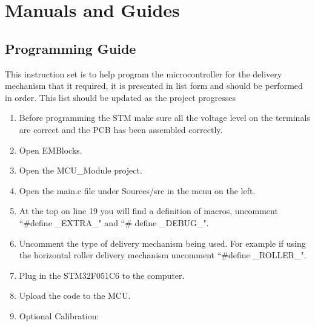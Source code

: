 \documentclass[a4paper,11pt]{article}
\numberwithin{figure}{section}
\numberwithin{table}{section}
\begin{document}
\begin{appendices}
\begin{lstlisting}
\end{lstlisting}

\newpage
\section{Manuals and Guides}\thispagestyle{sectionstart}

\subsection{Programming Guide}
\label{subsec:progamming}
This instruction set is to help program the microcontroller for the delivery mechanism that it required, it is presented in list form and should be performed in order. This list should be updated as the project progresses
\begin{enumerate}
  \item Before programming the STM make sure all the voltage level on the terminals are correct and the PCB has been assembled correctly.
  \item Open EMBlocks.
  \item Open the MCU\_Module project.
  \item Open the main.c file under Sources/src in the menu on the left.
  \item At the top on line 19 you will find a definition of macros, uncomment ``\#define \_EXTRA\_" and ``\# define \_DEBUG\_".
  \item Uncomment the type of delivery mechanism being used. For example if using the horizontal roller delivery mechanism uncomment ``\#define \_ROLLER\_".
  \item Plug in the STM32F051C6 to the computer.
  \item Upload the code to the MCU.
  \item Optional Calibration: {
  \begin{enumerate}
 

\end{enumerate}}
\end{enumerate}
\end{appendices}
\end{document}
